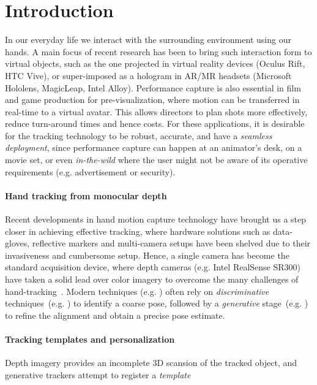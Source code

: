 \section{Introduction}
In our everyday life we interact with the surrounding environment using our hands. A main focus of recent research has been to bring such interaction form to virtual objects, such as the one projected in virtual reality devices (Oculus Rift, HTC Vive), or super-imposed as a hologram in AR/MR headsets (Microsoft Hololens, MagicLeap, Intel Alloy). 
Performance capture is also essential in film and game production for pre-visualization, where motion can be transferred in real-time to a virtual avatar. This allows directors to plan shots more effectively, reduce turn-around times and hence costs.
For these applications, it is desirable for the tracking technology to be robust, accurate, and have a \emph{seamless deployment}, since performance capture can happen at an animator's desk, on a movie set, or even \emph{in-the-wild} where the user might not be aware of its operative requirements (e.g. advertisement or security).

\paragraph{Hand tracking from monocular depth}
Recent developments in hand motion capture technology have brought us a step closer in achieving effective tracking, where hardware solutions such as data-gloves, reflective markers and multi-camera setups have been shelved due to their invasiveness and cumbersome setup.
Hence, a single camera has become the standard acquisition device, where depth cameras (e.g. Intel RealSense SR300)  have taken a solid lead over color imagery to overcome the many challenges of hand-tracking~\cite{supancic2015depth}. 
Modern techniques (e.g. \cite{taylor2016joint}) often rely on \emph{discriminative} techniques~(e.g. \cite{valentin2016learning}) to identify a coarse pose, followed by a \emph{generative} stage~(e.g. \cite{tkach2016sphere}) to refine the alignment and obtain a precise pose estimate.


\paragraph{Tracking templates and personalization}
Depth imagery provides an incomplete 3D scansion of the tracked object, and generative trackers attempt to register a \emph{template} 

